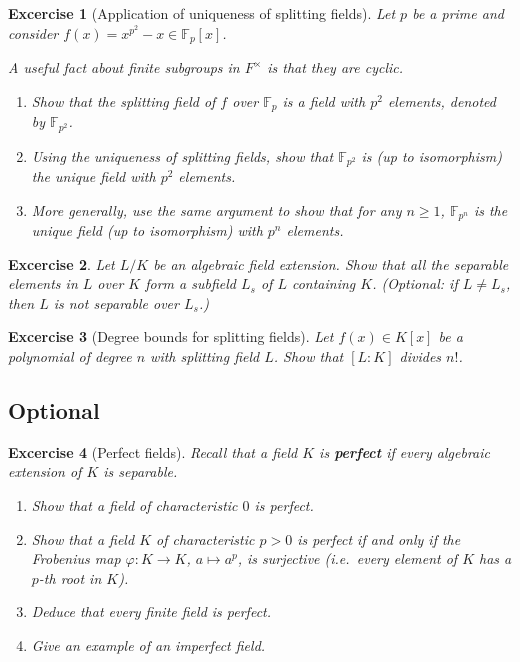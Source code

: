\documentclass{article}
\newtheorem{exer}{Excercise}
\newcommand{\F}{\mathbb{F}}
\begin{document}
    
\begin{exer}[Application of uniqueness of splitting fields]
Let $p$ be a prime and consider $f(x)=x^{p^2}-x\in\F_p[x]$.

A useful fact about finite subgroups in $F^\times$ is that they are cyclic.

\begin{enumerate}
  \item Show that the splitting field of $f$ over $\F_p$ is a field with $p^2$ elements, denoted by $\F_{p^2}$.
  \item Using the uniqueness of splitting fields, show that $\F_{p^2}$ is (up to isomorphism) the unique field with $p^2$ elements.
  \item More generally, use the same argument to show that for any $n\ge 1$, $\F_{p^n}$ is the unique field (up to isomorphism) with $p^n$ elements.
\end{enumerate}
\end{exer}

\begin{exer}
  Let $L/K$ be an algebraic field extension. Show that all the separable elements in $L$ over $K$ form a subfield $L_s$ of $L$ containing $K$. (Optional: if $L\neq L_s$, then $L$ is not separable over $L_s$.)
\end{exer}

\begin{exer}[Degree bounds for splitting fields]
Let $f(x)\in K[x]$ be a polynomial of degree $n$ with splitting field $L$. Show that $[L:K]$ divides $n!$.
\end{exer}


\subsection{Optional}


\begin{exer}[Perfect fields]
Recall that a field $K$ is \textbf{perfect} if every algebraic extension of $K$ is separable.
\begin{enumerate}
  \item Show that a field of characteristic $0$ is perfect.
  \item Show that a field $K$ of characteristic $p>0$ is perfect if and only if the Frobenius map $\varphi\colon K\to K$, $a\mapsto a^p$, is surjective (i.e.\ every element of $K$ has a $p$-th root in $K$).
  \item Deduce that every finite field is perfect.
  \item Give an example of an imperfect field.
\end{enumerate}
\end{exer}
\end{document}
